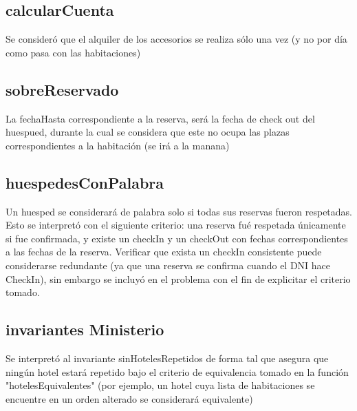 \subsection{calcularCuenta}

Se consider\'o que el alquiler de los accesorios se realiza s\'olo una vez (y no por d\'ia como pasa con las habitaciones)

\subsection{sobreReservado}

La fechaHasta correspondiente a la reserva, ser\'a la fecha de check out del huespued, durante la cual se considera que este no ocupa las plazas correspondientes a la habitaci\'on (se ir\'a a la manana)

\subsection{huespedesConPalabra}

Un huesped se considerar\'a de palabra solo si todas sus reservas fueron respetadas. Esto se interpret\'o con el siguiente criterio:
una reserva fu\'e respetada \'unicamente si fue confirmada, y existe un checkIn y un checkOut con fechas correspondientes
a las fechas de la reserva. Verificar que exista un checkIn consistente puede considerarse redundante (ya que una reserva se confirma
cuando el DNI hace CheckIn), sin embargo se incluy\'o en el problema con el fin de explicitar el criterio tomado.

\subsection{invariantes Ministerio}

Se interpret\'o al invariante sinHotelesRepetidos de forma tal que asegura que ning\'un hotel estar\'a repetido bajo el criterio de equivalencia tomado en la funci\'on "hotelesEquivalentes" (por ejemplo, un hotel cuya lista de habitaciones se encuentre en un orden alterado se considerar\'a equivalente)